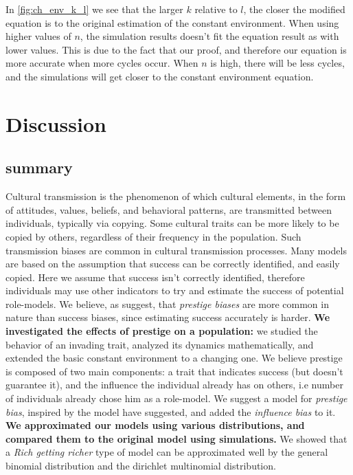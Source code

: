 \documentclass[11pt]{article}
\begin{document}
In \cref{fig:ch_env_k_l} we see that the larger $k$ relative to $l$, the closer the modified equation is to the original estimation of the constant environment. 
When using higher values of $n$, the simulation results doesn't fit the equation result as with lower values. This is due to the fact that our proof, and therefore our equation is more accurate when more cycles occur. When $n$ is high, there will be less cycles, and the simulations will get closer to the constant environment equation.

\section{Discussion}
\subsection{summary}
Cultural transmission is the phenomenon of which cultural elements, in the form of attitudes, values, beliefs, and behavioral patterns, are transmitted between individuals, typically via copying.
Some cultural traits can be more likely to be copied by others, regardless of their frequency in the population.  
Such transmission biases are common in cultural transmission processes. 
Many models are based on the assumption that success can be correctly identified, and easily copied.
Here we assume that success isn't correctly identified, therefore individuals may use other indicators to try and estimate the success of potential role-models.
We believe, as \citet{complexityPaper} suggest, that \textit{prestige biases} are more common in nature than success biases, since estimating success accurately is harder.
\textbf{We investigated the effects of prestige on a population:} we studied the behavior of an invading trait, analyzed its dynamics mathematically, and extended the basic constant environment to a changing one.
We believe prestige is composed of two main components: a trait that indicates success (but doesn't guarantee it), and the influence the individual already has on others, i.e number of individuals already chose him as a role-model.
We suggest a model for \textit{prestige bias}, inspired by the model \citet{evolutionBook} have suggested, and added the \textit{influence bias} to it.
\textbf{We approximated our models using various distributions, and compared them to the original model using simulations.}
We showed that a \textit{Rich getting richer} type of model can be approximated well by the general binomial distribution and the dirichlet multinomial distribution.
\end{document}
